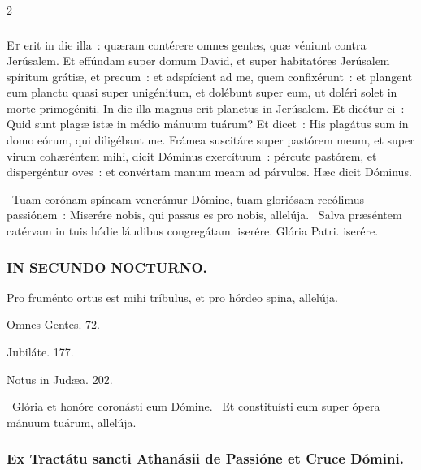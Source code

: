\documentclass[9pt,twoside]{extarticle}
\begin{document}
\begin{multicols}{2}
{{\subsubsection*{\center {}}
\lettrine{E}t erit in die illa~: quæram contérere omnes gentes, quæ véniunt contra Jerúsalem.
Et effúndam super domum David, et super habitatóres Jerúsalem spíritum grátiæ, et precum~: et adspícient ad me, quem confixérunt~: et plangent eum planctu quasi super unigénitum, et dolébunt super eum, ut doléri solet in morte primogéniti.
In die illa magnus erit planctus in Jerúsalem. Et dicétur ei~: Quid sunt plagæ istæ in médio mánuum tuárum? Et dicet~: His plagátus sum in domo eórum, qui diligébant me.
Frámea suscitáre super pastórem meum, et super virum cohæréntem mihi, dicit Dóminus exercítuum~: pércute pastórem, et dispergéntur oves~: et convértam manum meam ad párvulos. Hæc dicit Dóminus.

\begin{tightlist}{}
\item {}~Tuam corónam spíneam venerámur Dómine, tuam gloriósam recólimus passiónem~: \textred{*} Miserére nobis, qui passus es pro nobis, allelúja. ~Salva præséntem catérvam in tuis hódie láudibus congregátam. iserére. Glória Patri. iserére.
\end{tightlist}

\subsubsection*{\center \textsc{IN SECUNDO NOCTURNO.}}
\begin{tightlist}{}
\item {} Pro fruménto ortus est mihi tríbulus, et pro hórdeo spina, allelúja.
\item {} Omnes Gentes. 72. 
\item {} Jubiláte. 177. 
\item {} Notus in Judæa. 202.
\item {}~Glória et honóre coronásti eum Dómine. ~Et constituísti eum super ópera mánuum tuárum, allelúja.
\end{tightlist}

\subsubsection*{\center Ex Tractátu sancti Athanásii de Passióne et Cruce Dómini.}
}}
\end{multicols}
\end{document}
